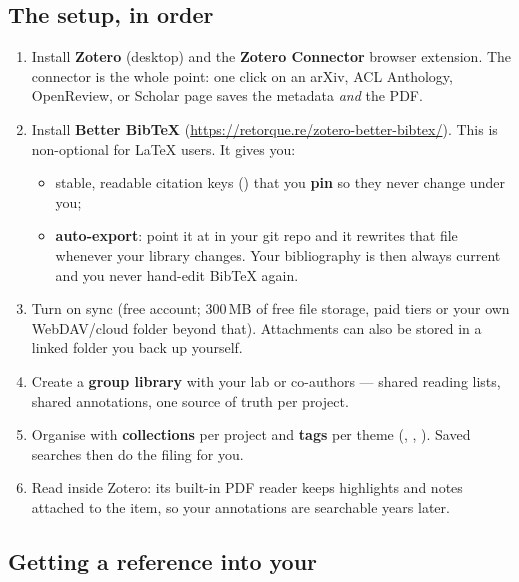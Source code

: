 \documentclass[11pt,a4paper]{article}
\begin{document}
\subsection{The setup, in order}

\begin{enumerate}
  \item Install \textbf{Zotero} (desktop) and the \textbf{Zotero Connector}
        browser extension. The connector is the whole point: one click on an
        arXiv, ACL Anthology, OpenReview, or Scholar page saves the metadata
        \emph{and} the PDF.
  \item Install \textbf{Better BibTeX} (\url{https://retorque.re/zotero-better-bibtex/}).
        This is non-optional for LaTeX users. It gives you:
        \begin{itemize}
          \item stable, readable citation keys () that you
                \textbf{pin} so they never change under you;
          \item \textbf{auto-export}: point it at  in your
                git repo and it rewrites that file whenever your library
                changes. Your bibliography is then always current and you never
                hand-edit BibTeX again.
        \end{itemize}
  \item Turn on sync (free account; 300\,MB of free file storage, paid tiers or
        your own WebDAV/cloud folder beyond that). Attachments can also be
        stored in a linked folder you back up yourself.
  \item Create a \textbf{group library} with your lab or co-authors --- shared
        reading lists, shared annotations, one source of truth per project.
  \item Organise with \textbf{collections} per project and \textbf{tags} per
        theme (, ,
        ). Saved searches then do the filing for you.
  \item Read inside Zotero: its built-in PDF reader keeps highlights and
        notes attached to the item, so your annotations are searchable years
        later.
\end{enumerate}

\subsection{Getting a reference into your }
\end{document}
